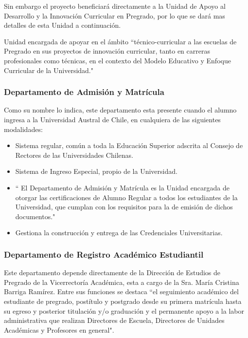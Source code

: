 		Sin embargo el proyecto beneficiará directamente  a la Unidad de Apoyo al Desarrollo y la Innovación Curricular en Pregrado, por lo que se dará mas detalles de esta Unidad a continuación.
		
		
		
		Unidad encargada de apoyar en el ámbito ``técnico-curricular a las escuelas de Pregrado en sus proyectos de innovación curricular, tanto en carreras profesionales como técnicas, en el contexto del Modelo Educativo y Enfoque Curricular de la Universidad."\cite{Dac15}
		\subsubsection{Departamento de Admisión y Matrícula}
		
		Como su nombre lo indica, este departamento esta presente cuando el alumno ingresa a la Universidad Austral de Chile, en cualquiera de las siguientes modalidades:
			\begin{itemize}
				\item Sistema regular, común a toda la Educación Superior adscrita al Consejo de Rectores de las Universidades Chilenas.
				\item Sistema de Ingreso Especial, propio de la Universidad.
			\end{itemize}
			
		
			\begin{itemize}
				\item 	`` El Departamento de Admisión y Matrícula es la Unidad encargada de otorgar las certificaciones de Alumno Regular a todos los estudiantes de la Universidad, que cumplan con los requisitos para la de emisión de dichos documentos."\cite{Dep15}
				\item Gestiona  la construcción y entrega de las Credenciales Universitarias.
			\end{itemize}
			
		
		
		
		\subsubsection{Departamento de Registro Académico Estudiantil}
		
		Este departamento depende directamente de la Dirección de Estudios de Pregrado de la Vicerrectoría Académica, esta a cargo de la Sra. María Cristina Barriga Ramírez. Entre sus funciones se destaca ``el seguimiento académico del estudiante de pregrado, postítulo y postgrado desde su primera matrícula hasta su egreso y posterior titulación y/o graduación y el permanente apoyo a la labor administrativa que realizan Directores de Escuela, Directores de Unidades Académicas y Profesores en general"\cite{Dir15}.
		

